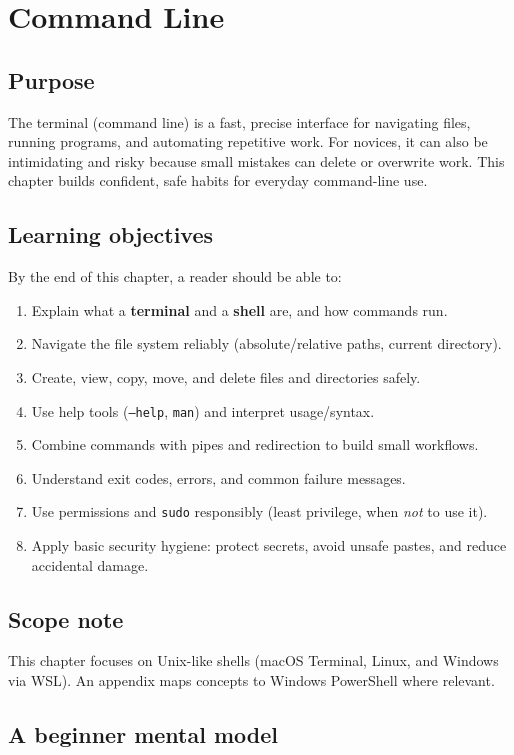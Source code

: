 \chapter{Command Line}
\label{ch:terminal}

\section*{Purpose}
The terminal (command line) is a fast, precise interface for navigating files, running programs, and automating repetitive work. For novices, it can also be intimidating and risky because small mistakes can delete or overwrite work. This chapter builds confident, safe habits for everyday command-line use.

\section*{Learning objectives}
By the end of this chapter, a reader should be able to:
\begin{enumerate}
\item Explain what a \textbf{terminal} and a \textbf{shell} are, and how commands run.
\item Navigate the file system reliably (absolute/relative paths, current directory).
\item Create, view, copy, move, and delete files and directories safely.
\item Use help tools (\texttt{--help}, \texttt{man}) and interpret usage/syntax.
\item Combine commands with pipes and redirection to build small workflows.
\item Understand exit codes, errors, and common failure messages.
\item Use permissions and \texttt{sudo} responsibly (least privilege, when \emph{not} to use it).
\item Apply basic security hygiene: protect secrets, avoid unsafe pastes, and reduce accidental damage.
\end{enumerate}

\section*{Scope note}
This chapter focuses on Unix-like shells (macOS Terminal, Linux, and Windows via WSL). An appendix maps concepts to Windows PowerShell where relevant.

\section{A beginner mental model}
